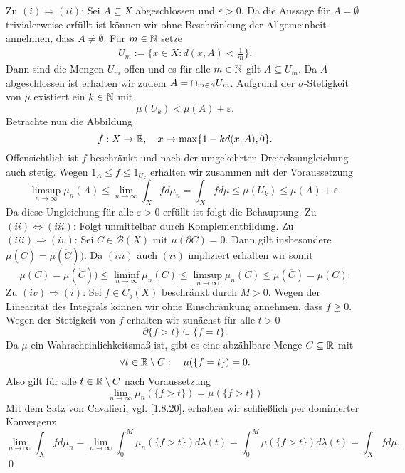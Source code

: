 \begin{proof*}
    Zu $(i) \Rightarrow (ii)$: Sei $A \subseteq X$ abgeschlossen und $\varepsilon > 0$. Da die Aussage für $A = \emptyset$ trivialerweise erfüllt ist
    können wir ohne Beschränkung der Allgemeinheit annehmen, dass $A \neq \emptyset$. Für $m \in \mathbb{N}$ setze
    \begin{align*}
        U_m := \{x \in X: d(x,A) < \frac{1}{m}\}.
    \end{align*}
    Dann sind die Mengen $U_m$ offen und es für alle $m \in \mathbb{N}$ gilt $A \subseteq U_m$. Da $A$ abgeschlossen ist erhalten wir zudem $ A = \cap_{m \in \mathbb{N}} U_m$. 
    Aufgrund der $\sigma$-Stetigkeit von $\mu$ existiert ein $k \in \mathbb{N}$ mit 
    $$
        \mu(U_k) < \mu(A) + \varepsilon . 
    $$
    Betrachte nun die Abbildung 
    $$
        f:X \to \mathbb{R}, \quad x \mapsto \max\{1 - kd(x,A), 0\}.
    $$
    Offensichtlich ist $f$ beschränkt und nach der umgekehrten Dreiecksungleichung auch stetig. Wegen $1_A \leq f \leq 1_{U_k}$ erhalten wir zusammen mit der Voraussetzung 
    $$
    \limsup_{n \to \infty} \mu_n(A) \leq \lim_{n \to \infty} \int_X fd\mu_n = \int_X fd\mu \leq \mu(U_k) \leq \mu(A) + \varepsilon.
    $$
    Da diese Ungleichung für alle $\varepsilon > 0$ erfüllt ist folgt die Behauptung. 
    \newline 
    Zu $(ii) \iff (iii)$: Folgt unmittelbar durch Komplementbildung. 
    \newline
    Zu $(iii) \Rightarrow (iv)$: 
    Sei $C \in \mathcal{B}(X)$ mit $\mu(\partial C) = 0$. Dann gilt insbesondere $\mu(\overline{C}) = \mu(\mathring{C}))$. Da $(iii)$ auch $(ii)$ impliziert erhalten wir somit
    $$
        \mu(C) = \mu(\mathring{C})) \leq \liminf_{n \to \infty} \mu_n(C) \leq \limsup_{n \to \infty} \mu_n(C) \leq \mu(\overline{C}) = \mu(C).
    $$
    \newline 
    Zu $(iv) \Rightarrow (i)$: 
    Sei $f \in C_b(X)$ beschränkt durch $M > 0$. Wegen der Linearität des Integrals können wir ohne Einschränkung annehmen, dass $f \geq 0$. 
    Wegen der Stetigkeit von $f$ erhalten wir zunächst für alle $t > 0$
    $$
        \partial\{ f > t \} \subseteq \{f = t \}. 
    $$
    Da $\mu$ ein Wahrscheinlichkeitsmaß ist, gibt es eine abzählbare Menge $C \subseteq \mathbb{R}$ mit 
    $$
        \forall t \in \mathbb{R} \setminus C: \quad \mu(\{f = t \}) = 0. 
    $$
    Also gilt für alle $t \in \mathbb{R} \setminus C$ nach Voraussetzung 
    $$
        \lim_{n \to \infty} \mu_n(\{f > t \}) = \mu(\{f > t \})
    $$
    Mit dem Satz von Cavalieri, vgl. \cite{gs}[1.8.20], erhalten wir schließlich per dominierter Konvergenz
    $$
        \lim_{n \to \infty} \int_X fd\mu_n = \lim_{n \to \infty} \int_0^M \mu_n(\{f > t \})d\lambda(t) = \int_0^M \mu(\{f > t \}) d\lambda(t) = \int_Xfd\mu. 
    $$
    \qed 
\end{proof*}